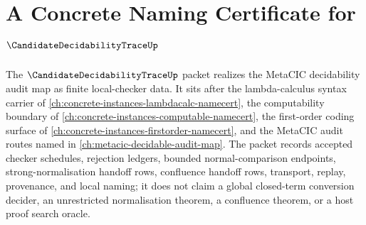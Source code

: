 \chapter{A Concrete Naming Certificate for $\CandidateDecidabilityTraceUp$}
\label{ch:concrete-instances-candidate-decidability-trace-namecert}

The $\CandidateDecidabilityTraceUp$ packet realizes the MetaCIC decidability audit map as finite local-checker data. It sits after the lambda-calculus syntax carrier of \autoref{ch:concrete-instances-lambdacalc-namecert}, the computability boundary of \autoref{ch:concrete-instances-computable-namecert}, the first-order coding surface of \autoref{ch:concrete-instances-firstorder-namecert}, and the MetaCIC audit routes named in \autoref{ch:metacic-decidable-audit-map}. The packet records accepted checker schedules, rejection ledgers, bounded normal-comparison endpoints, strong-normalisation handoff rows, confluence handoff rows, transport, replay, provenance, and local naming; it does not claim a global closed-term conversion decider, an unrestricted normalisation theorem, a confluence theorem, or a host proof search oracle.

